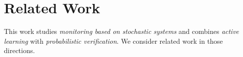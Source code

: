 \documentclass[runningheads]{llncs}
\newcommand{\sj}[2][]{\todo[color=red!50!white,#1]{\footnotesize{SJ: #2}}}
\newcommand{\alg}{ToVer\xspace}
\begin{document}

\section{Related Work}
This work studies \emph{monitoring based on stochastic systems} and combines \emph{active learning} with \emph{probabilistic verification}. We consider related work in those directions.
\end{document}
